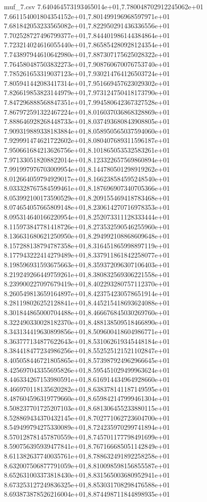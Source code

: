\begin{filecontents*}{muf_7.csv}
7.640464573193465014e+01,7.780048702912245062e+01
7.661154001804354152e+01,7.801499196968597971e+01
7.681842053233565082e+01,7.822950291436336556e+01
7.702528727496799377e+01,7.844401986144384864e+01
7.723214024616055440e+01,7.865854280928124354e+01
7.743897944610642980e+01,7.887307175625028322e+01
7.764580487503832273e+01,7.908760670076753740e+01
7.785261653319037123e+01,7.930214764126503724e+01
7.805941442083417314e+01,7.951669457623029302e+01
7.826619853823144979e+01,7.973124750418173790e+01
7.847296888568847351e+01,7.994580642367327528e+01
7.867972591322467224e+01,8.016037036868328869e+01
7.888646928268448733e+01,8.037493680843908805e+01
7.909319889338183884e+01,8.058950565037594060e+01
7.929991474621722602e+01,8.080407689311596187e+01
7.950661684213626756e+01,8.101865053532583261e+01
7.971330518208822014e+01,8.123322657569860894e+01
7.991997976703009954e+01,8.144780501298919262e+01
8.012664059794929017e+01,8.166238584595248540e+01
8.033328767584599461e+01,8.187696907340705366e+01
8.053992100173590529e+01,8.209155469418783468e+01
8.074654057665809148e+01,8.230614270716978353e+01
8.095314640166220954e+01,8.252073311128333444e+01
8.115973847781418726e+01,8.273532590546255960e+01
8.136631680621250950e+01,8.294992108868609648e+01
8.157288138794787358e+01,8.316451865998897119e+01
8.177943222414279489e+01,8.337911861842258077e+01
8.198596931593675663e+01,8.359372096307106403e+01
8.219249266449759261e+01,8.380832569306221558e+01
8.239900227097679419e+01,8.402293280757112370e+01
8.260549813659164897e+01,8.423754230578651914e+01
8.281198026252128841e+01,8.445215418693624088e+01
8.301844865000704488e+01,8.466676845030269760e+01
8.322490330028182370e+01,8.488138509518466890e+01
8.343134419630899856e+01,8.509600418604986771e+01
8.363777134877622643e+01,8.531062619345448184e+01
8.384418477234986256e+01,8.552525121521102847e+01
8.405058446721805865e+01,8.573987924962966645e+01
8.425697043355695826e+01,8.595451029499963624e+01
8.446334267153980591e+01,8.616914434964928660e+01
8.466970118135620282e+01,8.638378141187149595e+01
8.487604596319779660e+01,8.659842147999461304e+01
8.508237701725207103e+01,8.681306455233880115e+01
8.528869434370432145e+01,8.702771062723604700e+01
8.549499794275330089e+01,8.724235970299741894e+01
8.570128781457870559e+01,8.745701177798491699e+01
8.590756395939477841e+01,8.767166685051142849e+01
8.611382637740035761e+01,8.788632491892258258e+01
8.632007506877791059e+01,8.810098598156855587e+01
8.652631003373818430e+01,8.831565003680952941e+01
8.673253127249836325e+01,8.853031708298476588e+01
8.693873878526216004e+01,8.874498711844898935e+01

\end{filecontents*}
